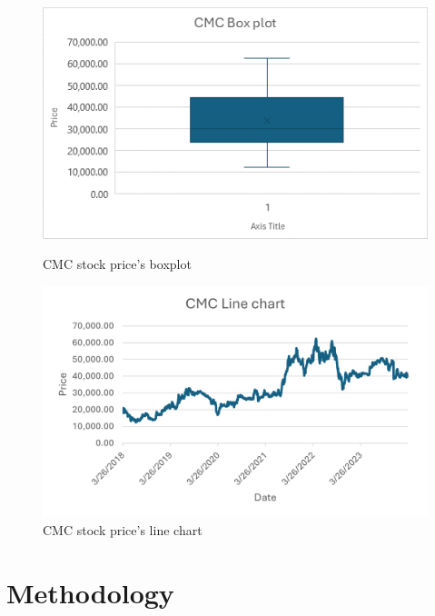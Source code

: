 \documentclass[conference]{IEEEtran}
\begin{document}
\begin{figure}[H]
    \centering
    \begin{minipage}{0.23\textwidth}
    \centering
    \includegraphics[width=1\textwidth]{Figure/cmcBox.png}
    \caption{CMC stock price's boxplot}
    \label{fig:1}
    \end{minipage}
    \hfill
    \begin{minipage}{0.23\textwidth}
    \centering
    \includegraphics[width=1\textwidth]{Figure/cmc-line.png}
    \caption{CMC stock price's line chart}
    \label{fig:2}
    \end{minipage}
\end{figure}



\section{Methodology}
\end{document}
